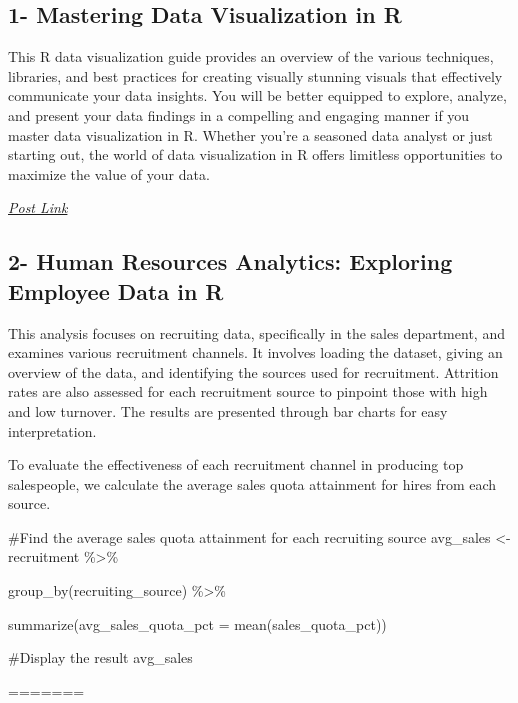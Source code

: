 \documentclass[
  letterpaper,
  DIV=11,
  numbers=noendperiod]{scrreprt}
\begin{document}
\hypertarget{mastering-data-visualization-in-r}{%
\subsection{1- Mastering Data Visualization in
R}\label{mastering-data-visualization-in-r}}

This R data visualization guide provides an overview of the various
techniques, libraries, and best practices for creating visually stunning
visuals that effectively communicate your data insights. You will be
better equipped to explore, analyze, and present your data findings in a
compelling and engaging manner if you master data visualization in R.
Whether you're a seasoned data analyst or just starting out, the world
of data visualization in R offers limitless opportunities to maximize
the value of your data.

\href{https://medium.com/@HalderNilimesh/mastering-data-visualization-in-r-a-comprehensive-guide-to-creating-stunning-visuals-and-f733564a8a41}{\emph{Post
Link}}

\hypertarget{human-resources-analytics-exploring-employee-data-in-r}{%
\subsection{2- Human Resources Analytics: Exploring Employee Data in
R}\label{human-resources-analytics-exploring-employee-data-in-r}}

This analysis focuses on recruiting data, specifically in the sales
department, and examines various recruitment channels. It involves
loading the dataset, giving an overview of the data, and identifying the
sources used for recruitment. Attrition rates are also assessed for each
recruitment source to pinpoint those with high and low turnover. The
results are presented through bar charts for easy interpretation.

To evaluate the effectiveness of each recruitment channel in producing
top salespeople, we calculate the average sales quota attainment for
hires from each source.

\#Find the average sales quota attainment for each recruiting source
avg\_sales \textless- recruitment \%\textgreater\%

group\_by(recruiting\_source) \%\textgreater\%

summarize(avg\_sales\_quota\_pct = mean(sales\_quota\_pct))

\#Display the result avg\_sales

=======
\end{document}
